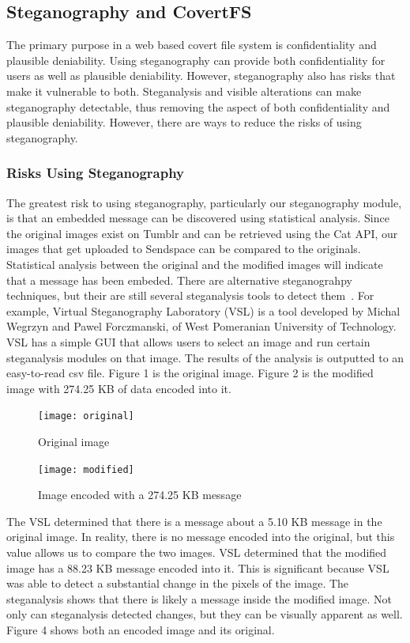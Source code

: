 \subsection{Steganography and CovertFS}


The primary purpose in a web based covert file system is confidentiality and plausible deniability. Using steganography can provide both confidentiality for users as well as plausible deniability. However, steganography also has risks that make it vulnerable to both. Steganalysis and visible alterations\cite{Steganalysis} can make steganography detectable, thus removing the aspect of both confidentiality and plausible deniability. However, there are ways to reduce the risks of using steganography. 

\subsubsection{Risks Using Steganography}

The greatest risk to using steganography, particularly our steganography module, is that an embedded message can be discovered using statistical analysis. Since the original images exist on Tumblr and can be retrieved using the Cat API, our images that get uploaded to Sendspace can be compared to the originals. Statistical analysis between the original and the modified images will indicate that a message has been embeded. There are alternative steganograhpy techniques, but their are still several steganalysis tools to detect them~\cite{Laden}. For example, Virtual Steganography Laboratory (VSL) is a tool developed by Michal Wegrzyn and Pawel Forczmanski, of West Pomeranian University of Technology. VSL has a simple GUI that allows users to select an image and run certain steganalysis modules on that image. The results of the analysis is outputted to an easy-to-read csv file. Figure 1 is the original image. Figure 2 is the modified image with 274.25 KB of data encoded into it. 
\begin{figure}[h]
	\texttt{[image: original]}
	\caption{Original image}
\end{figure}
\begin{figure}[h]
	\texttt{[image: modified]}
	\caption{Image encoded with a 274.25 KB message}
\end{figure}
The VSL determined that there is a message about a 5.10 KB message in the original image. In reality, there is no message encoded into the original, but this value allows us to compare the two images. VSL determined that the modified image has a 88.23 KB message encoded into it. This is significant because VSL was able to detect a substantial change in the pixels of the image. The steganalysis shows that there is likely a message inside the modified image. Not only can steganalysis detected changes, but they can be visually apparent as well. Figure 4 shows both an encoded image and its original.


